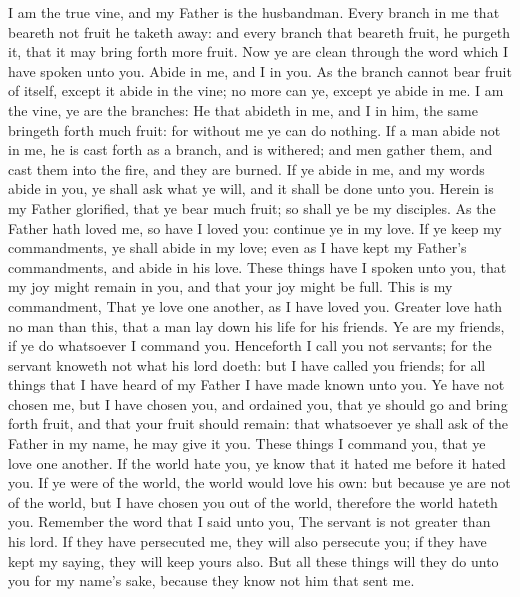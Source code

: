  I am the true vine, and my Father is the husbandman.
 Every branch in me that beareth not fruit he taketh away:
and every branch that beareth fruit, he purgeth it, that it may bring
forth more fruit.  Now ye are clean through the word which I
have spoken unto you.  Abide in me, and I in you. As the
branch cannot bear fruit of itself, except it abide in the vine; no more
can ye, except ye abide in me.  I am the vine, ye are the
branches: He that abideth in me, and I in him, the same bringeth forth
much fruit: for without me ye can do nothing.  If a man
abide not in me, he is cast forth as a branch, and is withered; and men
gather them, and cast them into the fire, and they are burned.
 If ye abide in me, and my words abide in you, ye shall ask
what ye will, and it shall be done unto you.  Herein is my
Father glorified, that ye bear much fruit; so shall ye be my disciples.
 As the Father hath loved me, so have I loved you: continue
ye in my love.  If ye keep my commandments, ye shall abide
in my love; even as I have kept my Father's commandments, and abide in
his love.  These things have I spoken unto you, that my joy
might remain in you, and that your joy might be full.  This
is my commandment, That ye love one another, as I have loved you.
 Greater love hath no man than this, that a man lay down
his life for his friends.  Ye are my friends, if ye do
whatsoever I command you.  Henceforth I call you not
servants; for the servant knoweth not what his lord doeth: but I have
called you friends; for all things that I have heard of my Father I have
made known unto you.  Ye have not chosen me, but I have
chosen you, and ordained you, that ye should go and bring forth fruit,
and that your fruit should remain: that whatsoever ye shall ask of the
Father in my name, he may give it you.  These things I
command you, that ye love one another.  If the world hate
you, ye know that it hated me before it hated you.  If ye
were of the world, the world would love his own: but because ye are not
of the world, but I have chosen you out of the world, therefore the
world hateth you.  Remember the word that I said unto you,
The servant is not greater than his lord. If they have persecuted me,
they will also persecute you; if they have kept my saying, they will
keep yours also.  But all these things will they do unto
you for my name's sake, because they know not him that sent me.

